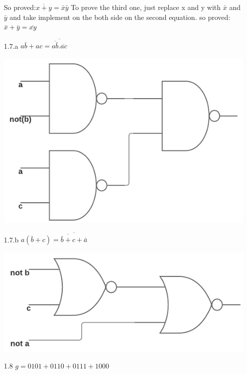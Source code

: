 \documentclass[10pt,twoside,a4paper]{article}
\begin{document}
\begin{enumerate}
So proved:$\overline{x+y}=\bar{x}\bar{y}$\newline
To prove the third one, just replace x and y with $\bar{x}$ and $\bar{y}$ \newline
and take implement on the both side on the second equation.\newline
so proved:$\bar{x}+\bar{y}=\overline{xy}$
\item[1.7.a]
$a\bar{b}+ac=\overline{\overline{a\bar{b}}.\overline{ac}}$

\includegraphics[scale=0.5]{1-7-a.png} 
\item[1.7.b]
$a(\bar{b}+c)=\overline{\overline{\bar{b}+c}+\bar{a}}$

\includegraphics[scale=0.5]{1-7-b.png} 

\item[1.8]
$g=0101+0110+0111+1000$


\end{enumerate}
\end{document}

